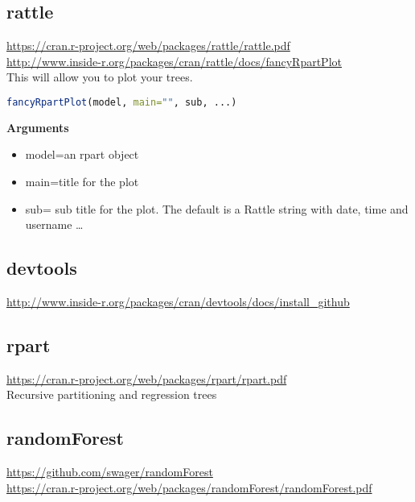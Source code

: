 \documentclass{article}
\begin{document}
\subsection{rattle} 
 	\url{https://cran.r-project.org/web/packages/rattle/rattle.pdf} \\
 	\url{http://www.inside-r.org/packages/cran/rattle/docs/fancyRpartPlot} \\
	This will allow you to plot your trees. 
\begin{lstlisting}[language=R]
fancyRpartPlot(model, main="", sub, ...)
\end{lstlisting}

\textbf{Arguments} \\
\begin{itemize}
  \item model=an rpart object
  \item main=title for the plot
  \item sub= sub title for the plot. The default is a Rattle string with date, time and username \ldots
\end{itemize}


\subsection{devtools}
 	\url{http://www.inside-r.org/packages/cran/devtools/docs/install_github} \\

\subsection{rpart} 
 	\url{https://cran.r-project.org/web/packages/rpart/rpart.pdf} \\
	Recursive partitioning and regression trees	
\subsection{randomForest}
\url{https://github.com/swager/randomForest} \\
\url{https://cran.r-project.org/web/packages/randomForest/randomForest.pdf}
\end{document}
